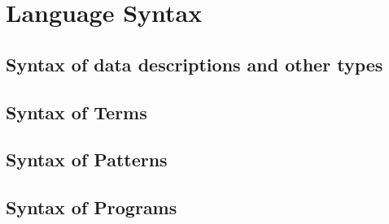\appendix

\section{Language Syntax}
\subsection{Syntax of data descriptions and other types}
\label{app:syntax-dd}


\subsection{Syntax of Terms}
\label{app:syntax-terms}

  
\subsection{Syntax of Patterns}
\label{app:syntax-pat}


\subsection{Syntax of Programs}
\label{app:syntax-prog}


